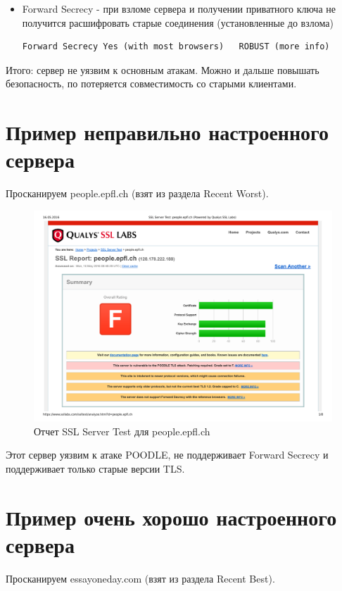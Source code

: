 \begin{itemize}
	\item Forward Secrecy - при взломе сервера и получении приватного ключа не получится расшифровать старые соединения (установленные до взлома)
	\begin{lstlisting}
Forward Secrecy	Yes (with most browsers)   ROBUST (more info)
	\end{lstlisting}
\end{itemize}

Итого: сервер не уязвим к основным атакам. Можно и дальше повышать безопасность, по потеряется совместимость со старыми клиентами.

\section{Пример неправильно настроенного сервера}

Просканируем people.epfl.ch (взят из раздела Recent Worst).

\begin{figure}[H]
	\centering
	\includegraphics[width=\textwidth]{test2.pdf}
	\caption{Отчет SSL Server Test для people.epfl.ch}
\end{figure}

Этот сервер уязвим к атаке POODLE, не поддерживает Forward Secrecy и поддерживает только старые версии TLS.

\section{Пример очень хорошо настроенного сервера}

Просканируем essayoneday.com (взят из раздела Recent Best).

